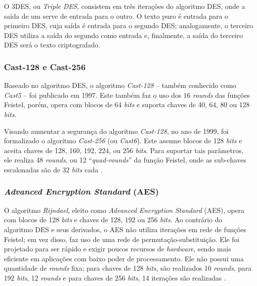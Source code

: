 \documentclass[a4paper,10pt,oneside,conference,final,keeplastbox]{inatel}
\newcommand{\bits}{\textit{bits}\xspace}
\begin{document}
                O 3DES, ou \textit{Triple DES}, consistem em três iterações do algoritmo DES, onde a saída de um serve de entrada para o outro. O texto puro é entrada para o primeiro DES, cuja saída é entrada para o segundo DES; analogamente, o terceiro DES utiliza a saída do segundo como entrada e, finalmente, a saída do terceiro DES será o texto criptografado.
            
            \subsubsection{Cast-128 e Cast-256}
            \label{subsubsec:cast128}
            
                Baseado no algoritmo DES, o algoritmo \textit{Cast-128} -- também conhecido como \textit{Cast5} -- foi publicado em 1997. Este também faz o uso dos 16 \textit{rounds} das funções Feistel, porém, opera com blocos de 64 \bits e suporta chaves de 40, 64, 80 ou 128 \bits \cite{adams1997cast128}.
                
                Visando aumentar a segurança do algoritmo \textit{Cast-128}, no ano de 1999, foi formalizado o algoritmo \textit{Cast-256} (ou \textit{Cast6}). Este assume blocos de 128 \bits e aceita chaves de 128, 160, 192, 224, ou 256 \bits \cite{adams1999cast256}. Para suportar tais parâmetros, ele realiza 48 \textit{rounds}, ou 12 ``\textit{quad-rounds}'' da função Feistel, onde as sub-chaves escalonadas são de 32 \bits cada \cite{riaz1999cast256fpga}.
            
            \subsubsection{\textit{Advanced Encryption Standard} (AES)}
            \label{subsubsec:aes}
                
                O algoritmo \textit{Rijndael}, eleito como \textit{Advanced Encryption Standard} (AES), opera com blocos de 128 \bits e chaves de 128, 192 ou 256 \bits. Ao contrário do algoritmo DES e seus derivados, o AES não utiliza iterações em rede de funções Feistel; em vez disso, faz uso de uma rede de permutação-substituição. Ele foi projetado para ser rápido e exigir poucos recursos de \textit{hardware}, sendo mais eficiente em aplicações com baixo poder de processamento. Ele não possui uma quantidade de \textit{rounds} fixa; para chaves de 128 \bits, são realizados 10 \textit{rounds}, para 192 \bits, 12 \textit{rounds} e para chaves de 256 \bits, 14 iterações são realizadas \cite{daemen2013aes}.
                
\end{document}
